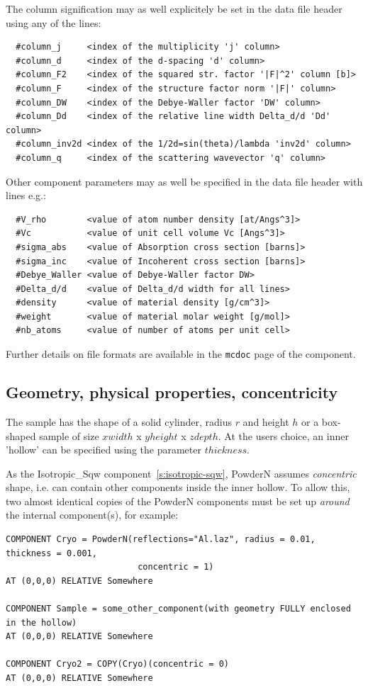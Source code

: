 The column signification may as well explicitely be set in the data file header using any of the lines:
\begin{lstlisting}
  #column_j     <index of the multiplicity 'j' column>
  #column_d     <index of the d-spacing 'd' column>
  #column_F2    <index of the squared str. factor '|F|^2' column [b]>
  #column_F     <index of the structure factor norm '|F|' column>
  #column_DW    <index of the Debye-Waller factor 'DW' column>
  #column_Dd    <index of the relative line width Delta_d/d 'Dd' column>
  #column_inv2d <index of the 1/2d=sin(theta)/lambda 'inv2d' column>
  #column_q     <index of the scattering wavevector 'q' column>
\end{lstlisting}

Other component parameters may as well be specified in the data file
header with lines e.g.:
\begin{lstlisting}
  #V_rho        <value of atom number density [at/Angs^3]>
  #Vc           <value of unit cell volume Vc [Angs^3]>
  #sigma_abs    <value of Absorption cross section [barns]>
  #sigma_inc    <value of Incoherent cross section [barns]>
  #Debye_Waller <value of Debye-Waller factor DW>
  #Delta_d/d    <value of Delta_d/d width for all lines>
  #density      <value of material density [g/cm^3]>
  #weight       <value of material molar weight [g/mol]>
  #nb_atoms     <value of number of atoms per unit cell>
\end{lstlisting}

Further details on file formats are available in the \verb+mcdoc+ page
of the component.

\subsection{Geometry, physical properties, concentricity}
The sample has the shape of a solid cylinder, radius $r$ and height $h$ or a box-shaped
sample of size $xwidth$ x $yheight$ x $zdepth$. At the users choice, an inner 'hollow' can be
specified using the parameter $thickness$. 


As the Isotropic\_Sqw component~\ref{s:isotropic-sqw}, PowderN assumes \emph{concentric} shape, i.e.
can contain other components inside the inner hollow. To allow this, two almost identical copies
of the PowderN components must be set up \emph{around} the internal component(s), for example:


\begin{lstlisting}
COMPONENT Cryo = PowderN(reflections="Al.laz", radius = 0.01, thickness = 0.001,
                          concentric = 1)
AT (0,0,0) RELATIVE Somewhere

COMPONENT Sample = some_other_component(with geometry FULLY enclosed in the hollow)
AT (0,0,0) RELATIVE Somewhere

COMPONENT Cryo2 = COPY(Cryo)(concentric = 0)
AT (0,0,0) RELATIVE Somewhere
\end{lstlisting}

